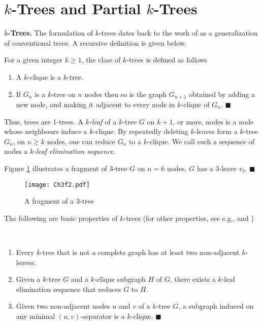 \section{$k$-Trees and Partial $k$-Trees}
\label{sec:ktree}
{\bf $k$-Trees.} The formulation of $k$-trees dates back to the work of \cite{beineke1969number, beineke1968enumeration} as a generalization of conventional trees. A recursive definition is given below.
\begin{definition} For a given integer $k\geq 1$, the class of $k$-trees is defined as follows
\begin{enumerate}[noitemsep]
\item A $k$-clique is a $k$-tree.
\item If $G_n$ is a $k$-tree on $n$ nodes then so is the graph $G_{n+1}$ obtained by adding a new node, and making it adjacent to every node in $k$-clique of $G_n$. $\blacksquare$
\end{enumerate}
\end{definition}

Thus, trees are 1-trees. A \textit{$k$-leaf} of a $k$-tree $G$ on $k+1$, or more, nodes is a node whose neighbours induce a $k$-clique. By repeatedly deleting $k$-leaves form a $k$-tree $G_n$, on $n\ge k$ nodes, one can reduce $G_n$ to a $k$-clique. We call such a sequence of nodes a \textit{$k$-leaf elimination sequence}.
\begin{example}
\normalfont
Figure \ref{fig:f3t1} illustrates a fragment of $3$-tree $G$ on $n=6$ nodes. $G$ has a $3$-leave $v_b$. $\blacksquare$
\end{example}
\begin{figure}[!htb]
\centering
\texttt{[image: Ch3f2.pdf]}
 \caption{ A fragment of a 3-tree}
 \label{fig:f3t1}
\end{figure}

 The following are basic properties of $k$-trees (for other properties, see e.g., \cite{golumbic2004algorithmic} and \cite{proskurowski1984separating})

\begin{lemma}\label{lem:1} \mbox{ }
\normalfont
\begin{enumerate}[noitemsep]
\item Every $k$-tree that is not a complete graph has at least two non-adjacent $k$-leaves.
\item Given a $k$-tree $G$ and a $k$-clique subgraph $H$ of $G$, there exists a $k$-leaf elimination sequence that reduces $G$ to $H$.
\item Given two non-adjacent nodes $u$ and $v$ of a $k$-tree $G$, a subgraph induced on any minimal $(u,v)$-separator is a $k$-clique. $\blacksquare$
\end{enumerate}
\end{lemma}

